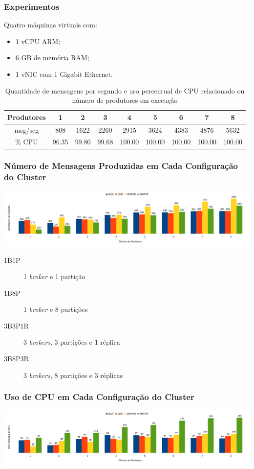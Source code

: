\documentclass[hyperref={bookmarks=false},aspectratio=169]{beamer}
\begin{document}
\begin{frame}
\frametitle{Experimentos}
Quatro máquinas virtuais com:
\begin{itemize} 
    \item 1 vCPU ARM; 
    \item 6 GB de memória RAM; 
    \item 1 vNIC com 1 Gigabit Ethernet. 
\end{itemize} 
\begin{table}[ht] 
\caption{Quantidade de mensagens por segundo e uso percentual de CPU relacionado ou número de produtores em execução}
\centering 
    \begin{tabular}{ |c|c|c|c|c|c|c|c|c| } 
        \hline 
        Produtores  & 1     & 2     & 3     & 4         & 5         & 6         & 7         & 8         \\
        \hline 
        msg/seg     & 808   & 1622  & 2260  & 2915      & 3624      & 4383      & 4876      & 5632      \\
        \% CPU      & 96.35 & 99.80 & 99.68 & 100.00    & 100.00    & 100.00    & 100.00    & 100.00    \\ 
        \hline 
    \end{tabular} 
    \label{tab:uso_recursos_caso_base} 
\end{table}
\end{frame}

\begin{frame}
\frametitle{Número de Mensagens Produzidas em Cada Configuração do Cluster}
\includegraphics[scale=0.3]{imagens/mensagens_por_segundo.png}
\begin{description}
    \item[1B1P] 1 \textit{broker} e 1 partição
    \item[1B8P] 1 \textit{broker} e 8 partições
    \item[3B3P1R] 3 \textit{brokers}, 3 partições e 1 réplica
    \item[3B8P3R] 3 \textit{brokers}, 8 partições e 3 réplicas
\end{description}
\end{frame}

\begin{frame}
\frametitle{Uso de CPU em Cada Configuração do Cluster}
\includegraphics[scale=0.3]{imagens/uso_de_cpu.png}
\end{frame}
\end{document}
